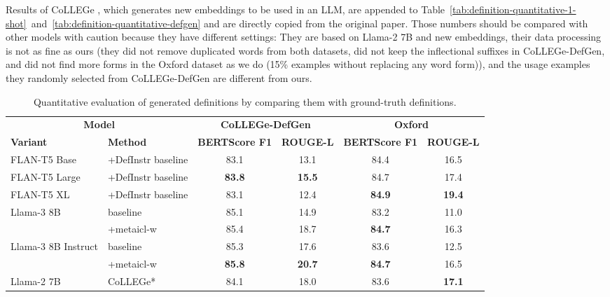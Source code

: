 \documentclass{article}
\begin{document}
Results of CoLLEGe \citep{Teehan2024CoLLEGeCE}, which generates new embeddings to be used in an LLM, are appended to Table~\ref{tab:definition-quantitative-1-shot}~and~\ref{tab:definition-quantitative-defgen} and are directly copied from the original paper. Those numbers should be compared with other models with caution because they have different settings: They are based on Llama-2 7B \citep{Llama-2} and new embeddings, their data processing is not as fine as ours (they did not remove duplicated words from both datasets, did not keep the inflectional suffixes in CoLLEGe-DefGen, and did not find more forms in the Oxford dataset as we do (15\% examples without replacing any word form)), and the usage examples they randomly selected from CoLLEGe-DefGen are different from ours.

\begin{table*}[t]
\small
\begin{center}
\begin{tabular}{p{2.7cm}l|cccc}
\toprule
\multicolumn{2}{c|}{\bf Model} & \multicolumn{2}{c}{\bf CoLLEGe-DefGen} & \multicolumn{2}{c}{\bf Oxford} \\
\bf Variant & \bf Method & \bf BERTScore F1 & \bf ROUGE-L & \bf BERTScore F1 & \bf ROUGE-L \\
\midrule
FLAN-T5 Base  &+DefInstr baseline          & 83.1 & 13.1 & 84.4 & 16.5 \\
FLAN-T5 Large &+DefInstr baseline          & \textbf{83.8} & \textbf{15.5} & 84.7 & 17.4 \\
FLAN-T5 XL    &+DefInstr baseline          & 83.1 & 12.4 & \textbf{84.9} & \textbf{19.4} \\
\midrule\midrule
\multirow{2}{=}{Llama-3 8B}
           &             baseline          & 85.1 & 14.9 & 83.2 & 11.0 \\
           & +\ac{metaicl-w}               & 85.4 & 18.7 & \textbf{84.7} & 16.3 \\
\midrule
\multirow{2}{=}{Llama-3 8B Instruct}
                   &     baseline          & 85.3 & 17.6 & 83.6 & 12.5 \\
                   &+\ac{metaicl-w}        & \textbf{85.8} & \textbf{20.7} & \textbf{84.7} & 16.5 \\
\midrule\midrule
Llama-2 7B         & CoLLEGe*              & 84.1 & 18.0 & 83.6 & \textbf{17.1} \\
\bottomrule
\end{tabular}
\end{center}
\caption{Quantitative evaluation of generated definitions by comparing them with ground-truth definitions.
}
\end{table*}
\end{document}
